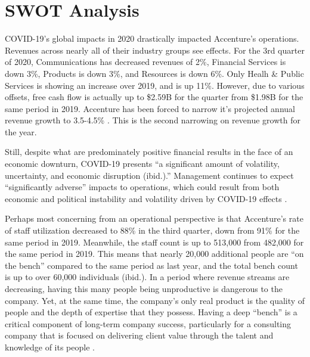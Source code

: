 \section{SWOT Analysis}

COVID-19's global impacts in 2020 drastically impacted Accenture's operations. Revenues across nearly all of their industry groups see effects. For the 3rd quarter of 2020, Communications has decreased revenues of 2\%, Financial Services is down 3\%, Products is down 3\%, and Resources is down 6\%. Only Healh \& Public Services is showing an increase over 2019, and is up 11\%. However, due to various offsets, free cash flow is actually up to \$2.59B for the quarter from \$1.98B for the same period in 2019. Accenture has been forced to narrow it's projected annual revenue growth to 3.5-4.5\% \parencite{accentureplcAccentureForm8K2020}. This is the second narrowing on revenue growth for the year.

Still, despite what are predominately positive financial results in the face of an economic downturn, COVID-19 presents ``a significant amount of volatility, uncertainty, and economic disruption (ibid.).'' Management continues to expect ``significantly adverse'' impacts to operations, which could result from both economic and political instability and volatility driven by COVID-19 effects \parencite{accentureplcForm10Q2020}.


Perhaps most concerning from an operational perspective is that Accenture's rate of staff utilization decreased to 88\% in the third quarter, down from 91\% for the same period in 2019. Meanwhile, the staff count is up to 513,000 from 482,000 for the same period in 2019. This means that nearly 20,000 additional people are ``on the bench'' compared to the same period as last year, and the total bench count is up to over 60,000 individuals (ibid.). In a period where revenue streams are decreasing, having this many people being unproductive is dangerous to the company. Yet, at the same time, the company's only real product is the quality of people and the depth of expertise that they possess. Having a deep ``bench'' is a critical component of long-term company success, particularly for a consulting company that is focused on delivering client value through the talent and knowledge of its people \parencite{alterBuildingStrongBench2017, accentureplcForm10Q2020}.

\hfill \break

